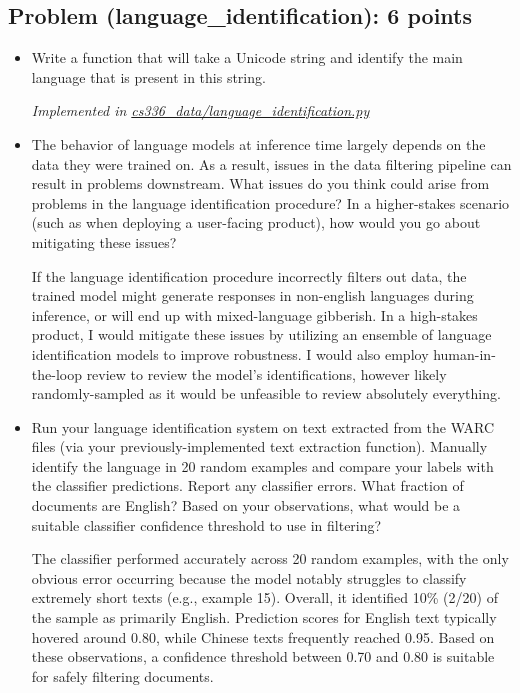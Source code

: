\documentclass[letterpaper]{article}
\begin{document}
\subsection{Problem (language\_identification): 6 points}

\begin{itemize}
	\item[(a)] Write a function that will take a Unicode string and identify the main language that is present in this string.

	\textit{Implemented in  \href{https://github.com/echung32/ece405-assignment2-data/blob/main/cs336_data/language_identification.py}{cs336\_data/language\_identification.py}}

	\item[(b)] The behavior of language models at inference time largely depends on the data they were trained on. As a result, issues in the data filtering pipeline can result in problems downstream. What issues do you think could arise from problems in the language identification procedure? In a higher-stakes scenario (such as when deploying a user-facing product), how would you go about
	mitigating these issues?

	If the language identification procedure incorrectly filters out data, the trained model might generate responses in non-english languages during inference, or will end up with mixed-language gibberish. In a high-stakes product, I would mitigate these issues by utilizing an ensemble of language identification models to improve robustness. I would also employ human-in-the-loop review to review the model's identifications, however likely randomly-sampled as it would be unfeasible to review absolutely everything.

	\item[(c)] Run your language identification system on text extracted from the WARC files (via your
	previously-implemented text extraction function). Manually identify the language in 20 random
	examples and compare your labels with the classifier predictions. Report any classifier errors. What fraction of documents are English? Based on your observations, what would be a suitable
	classifier confidence threshold to use in filtering?

	The classifier performed accurately across 20 random examples, with the only obvious error occurring because the model notably struggles to classify extremely short texts (e.g., example 15). Overall, it identified 10\% (2/20) of the sample as primarily English. Prediction scores for English text typically hovered around 0.80, while Chinese texts frequently reached 0.95. Based on these observations, a confidence threshold between 0.70 and 0.80 is suitable for safely filtering documents.


\end{itemize}
\end{document}
